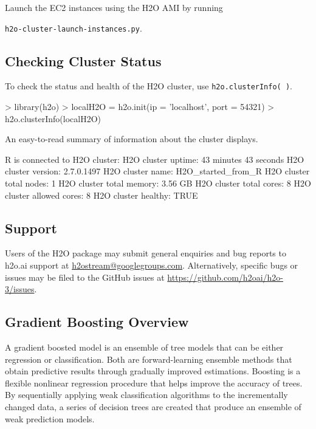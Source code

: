\documentclass[11pt]{article}
\begin{document}
Launch the EC2 instances using the H2O AMI by running {\texttt{h2o-cluster-launch-instances.py}.


\subsection{Checking Cluster Status}


To check the status and health of the H2O cluster, use {\texttt{h2o.clusterInfo( )}}.
\begin{spverbatim}
> library(h2o)
> localH2O = h2o.init(ip = 'localhost', port = 54321)
> h2o.clusterInfo(localH2O)
\end{spverbatim}

An easy-to-read summary of information about the cluster displays. 
\begin{spverbatim}
R is connected to H2O cluster:
  H2O cluster uptime:         43 minutes 43 seconds
  H2O cluster version:        2.7.0.1497
  H2O cluster name:           H2O_started_from_R
  H2O cluster total nodes:    1
  H2O cluster total memory:   3.56 GB
  H2O cluster total cores:    8
  H2O cluster allowed cores:  8
  H2O cluster healthy:        TRUE
\end{spverbatim}

\noindent

\subsection{Support} 
Users of the H2O package may submit general enquiries and bug reports to h2o.ai support at {\url{h2ostream@googlegroups.com}}. Alternatively, specific bugs or issues may be filed to the GitHub issues at {\url{https://github.com/h2oai/h2o-3/issues}}.

\subsection{Gradient Boosting Overview} 

A gradient boosted model is an ensemble of tree models that can be either regression or classification. Both are forward-learning ensemble methods that obtain predictive results through gradually improved estimations. Boosting is a flexible nonlinear regression procedure that helps improve the accuracy of trees. By sequentially applying weak classification algorithms to the incrementally changed data, a series of decision trees are created that produce an ensemble of weak prediction models.

}
\end{document}
